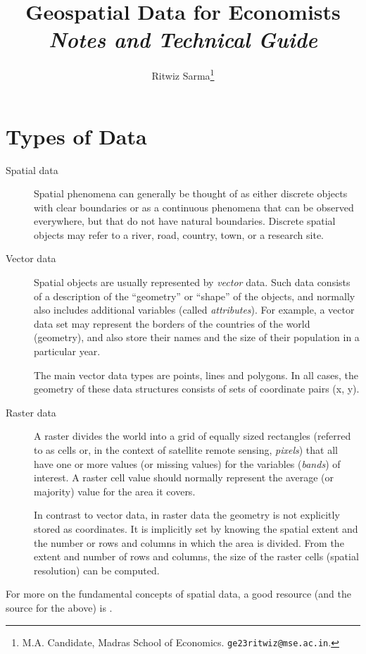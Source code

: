 \documentclass[12pt]{article}
\title{\textbf{Geospatial Data for Economists}\\[0.6em]\textit{Notes and Technical Guide}}
\author{Ritwiz Sarma\footnote{M.A. Candidate, Madras School of Economics. \texttt{ge23ritwiz@mse.ac.in}.}}
\date{}
\begin{document}
\maketitle


\section{Types of Data}

\begin{description}
    \item[Spatial data] Spatial phenomena can generally be thought of as either discrete objects with clear boundaries or as a continuous phenomena that can be observed everywhere, but that do not have natural boundaries. Discrete spatial objects may refer to a river, road, country, town, or a research site.
    \item[Vector data] Spatial objects are usually represented by \emph{vector} data. Such data consists of a description of the “geometry” or “shape” of the objects, and normally also includes additional variables (called \emph{attributes}). For example, a vector data set may represent the borders of the countries of the world (geometry), and also store their names and the size of their population in a particular year. 
    
    The main vector data types are points, lines and polygons. In all cases, the geometry of these data structures consists of sets of coordinate pairs (x, y).
    \item[Raster data] A raster divides the world into a grid of equally sized rectangles (referred to as cells or, in the context of satellite remote sensing, \emph{pixels}) that all have one or more values (or missing values) for the variables (\textit{bands}) of interest. A raster cell value should normally represent the average (or majority) value for the area it covers.
    
    In contrast to vector data, in raster data the geometry is not explicitly stored as coordinates. It is implicitly set by knowing the spatial extent and the number or rows and columns in which the area is divided. From the extent and number of rows and columns, the size of the raster cells (spatial resolution) can be computed.
    
\end{description}

For more on the fundamental concepts of spatial data, a good resource (and the source for the above) is \textcite{Rspatial}.
\end{document}
